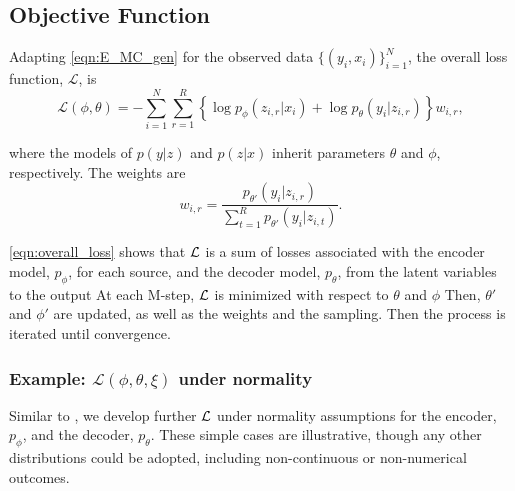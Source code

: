 \documentclass{article}
\begin{document}
\subsection{Objective Function}
\label{objective_function}
Adapting \autoref{eqn:E_MC_gen} for the observed data $\{(y_i,x_i)\}_{i=1}^N$, the overall loss function, $\mathcal{L}$, is
\begin{equation}
\label{eqn:overall_loss}
\mathcal{L}(\phi, \theta) = -\sum_{i=1}^N \sum_{r=1}^R\left\{\log p_{\phi}(z_{i,r} | x_i) + \log p_\theta(y_i | z_{i,r})\right\} w_{i,r},
\end{equation}

where the models of $p(y|z)$ and $p(z|x)$ inherit parameters \(\theta\) and \( \phi\), respectively. The weights are 
\begin{equation}
\label{eqn:compute_w}
w_{i,r} = \frac{p_{\theta'}(y_i | z_{i,r})}{\sum_{t=1}^R p_{\theta'}(y_i | z_{i,t})}.
\end{equation}

\autoref{eqn:overall_loss} shows that ${\cal L}$ is a sum of losses associated with the encoder model, $p_\phi$, for each source, and the decoder model, $p_\theta$, from the latent variables to the output
At each M-step, ${\cal L}$ is minimized with respect to $\theta$ and $\phi$
Then, $\theta'$ and $\phi'$
are updated, as well as the weights and the sampling. Then the process is iterated until convergence.

\subsubsection{Example: \texorpdfstring{$\mathcal{L}(\phi, \theta, \xi)$}{} under normality}
Similar to \cite{kingma2014vae}, we develop further ${\cal L}$ under normality assumptions for the encoder, $p_\phi$, and the decoder, $p_\theta$. These simple cases are illustrative, though any other distributions could be adopted, including non-continuous or non-numerical outcomes. 
\end{document}
